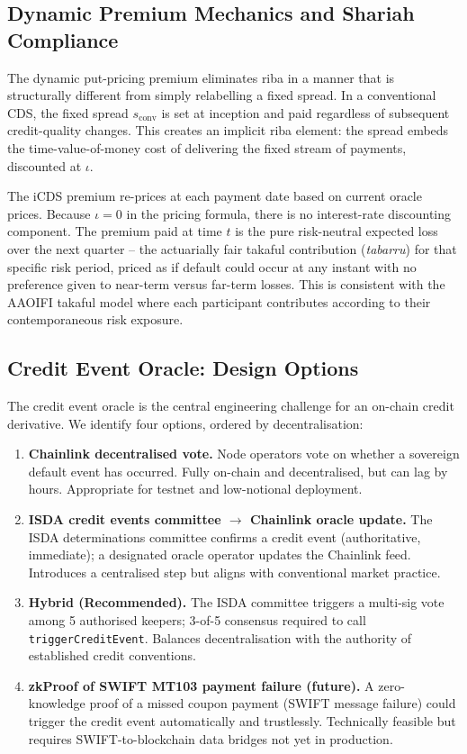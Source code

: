 \documentclass[12pt]{article}
\theoremstyle{plain}
\theoremstyle{definition}
\theoremstyle{remark}
\begin{document}
\subsection{Dynamic Premium Mechanics and Shariah Compliance}

The dynamic put-pricing premium eliminates riba in a manner that is
structurally different from simply relabelling a fixed spread.
In a conventional CDS, the fixed spread $s_{\text{conv}}$ is set at
inception and paid regardless of subsequent credit-quality changes.
This creates an implicit riba element: the spread embeds the time-value-of-money
cost of delivering the fixed stream of payments, discounted at $\iota$.

The iCDS premium re-prices at each payment date based on current oracle prices.
Because $\iota = 0$ in the pricing formula, there is no interest-rate
discounting component.
The premium paid at time $t$ is the pure risk-neutral expected loss over the
next quarter -- the actuarially fair takaful contribution (\emph{tabarru})
for that specific risk period, priced as if default could occur at any instant
with no preference given to near-term versus far-term losses.
This is consistent with the AAOIFI takaful model where each participant
contributes according to their contemporaneous risk exposure.

\subsection{Credit Event Oracle: Design Options}

The credit event oracle is the central engineering challenge for an
on-chain credit derivative.
We identify four options, ordered by decentralisation:

\begin{enumerate}[label=(\Alph*)]
  \item \textbf{Chainlink decentralised vote.}
    Node operators vote on whether a sovereign default event has occurred.
    Fully on-chain and decentralised, but can lag by hours.
    Appropriate for testnet and low-notional deployment.
  \item \textbf{ISDA credit events committee $\to$ Chainlink oracle update.}
    The ISDA determinations committee confirms a credit event (authoritative,
    immediate); a designated oracle operator updates the Chainlink feed.
    Introduces a centralised step but aligns with conventional market practice.
  \item \textbf{Hybrid (Recommended).}
    The ISDA committee triggers a multi-sig vote among 5 authorised keepers;
    3-of-5 consensus required to call \texttt{triggerCreditEvent}.
    Balances decentralisation with the authority of established credit
    conventions.
  \item \textbf{zkProof of SWIFT MT103 payment failure (future).}
    A zero-knowledge proof of a missed coupon payment (SWIFT message failure)
    could trigger the credit event automatically and trustlessly.
    Technically feasible but requires SWIFT-to-blockchain data bridges not
    yet in production.
\end{enumerate}
\end{document}
